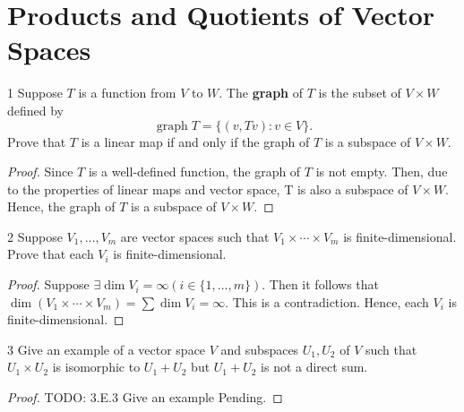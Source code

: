 \documentclass{article}
\newenvironment{problem}[1]{\begin{prob*}{#1}{}}{\end{prob*}}
\begin{document}
\section{Products and Quotients of Vector Spaces}

\begin{problem}{1}
Suppose $T $ is a function from $V $ to $W $. The \textbf{graph} of $T $ is the subset of $V \times W$ defined by \[
	\operatorname{graph} T = \{(v, Tv) : v \in V\}.\]
Prove that $T$ is a linear map if and only if the graph of $T$ is a subspace of $V \times W$.
\end{problem}
\begin{proof}
	Since $T$ is a well-defined function, the graph of $T$ is not empty. Then, due to the properties of linear maps and vector space, T is also a subspace of $V \times W$. Hence, the graph of $T$ is a subspace of $V \times W$.
\end{proof}

\begin{problem}{2}
Suppose $V_1, \ldots , V_m$ are vector spaces such that $V_1 \times \cdots \times V_m$ is finite-dimensional. Prove that each $V_i$ is finite-dimensional.
\end{problem}
\begin{proof}
	Suppose $\exists \operatorname{dim} V_i = \infty (i \in \{1, \ldots , m\})$. Then it follows that $\operatorname{dim} (V_1\times \cdots\times V_m) = \sum \operatorname{dim}V_i = \infty$. This is a contradiction. Hence, each $V_i$ is finite-dimensional.
\end{proof}

\begin{problem}{3}
Give an example of a vector space $V$ and subspaces $U_1, U_2$ of $V$ such that $U_1 \times U_2$ is isomorphic to $U_1 + U_2$ but $U_1 + U_2$ is not a direct sum.
\end{problem}
\begin{proof}
	TODO: 3.E.3 Give an example Pending.
\end{proof}
\end{document}
